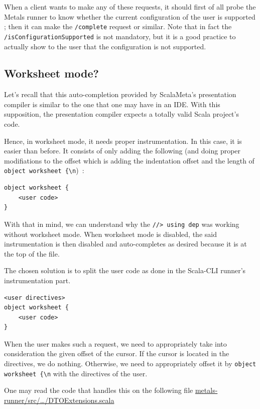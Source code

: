 \documentclass{article}
\begin{document}
When a client wants to make any of these requests, it should first of all probe the Metals runner to know whether the current configuration of the user is supported ; then it can make the \lstinline{/complete} request or similar. Note that in fact the \lstinline{/isConfigurationSupported} is not mandatory, but it is a good practice to actually show to the user that the configuration is not supported.

\subsection{Worksheet mode?}

Let's recall that this auto-completion provided by ScalaMeta's presentation compiler is similar to the one that one may have in an IDE. With this supposition, the presentation compiler expects a totally valid Scala project's code.

Hence, in worksheet mode, it needs proper instrumentation. In this case, it is easier than before. It consists of only adding the following (and doing proper modifiations to the offset which is adding the indentation offset and the length of \lstinline|object worksheet {\n|)~:

\begin{lstlisting}
object worksheet {
    <user code>
}
\end{lstlisting}

With that in mind, we can understand why the \lstinline{//> using dep} was working without worksheet mode. When worksheet mode is disabled, the said instrumentation is then disabled and auto-completes as desired because it is at the top of the file.

The chosen solution is to split the user code as done in the Scala-CLI runner's instrumentation part.

\begin{lstlisting}
<user directives>
object worksheet {
    <user code>
}
\end{lstlisting}

When the user makes such a request, we need to appropriately take into consideration the given offset of the cursor. If the cursor is located in the directives, we do nothing. Otherwise, we need to appropriately offset it by \lstinline|object worksheet {\n| with the directives of the user.

One may read the code that handles this on the following file \href{https://github.com/Maeeen/scastie/blob/main/metals-runner/src/main/scala/scastie/metals/DTOExtensions.scala}{metals-runner/src/\ldots/DTOExtensions.scala}
\end{document}
